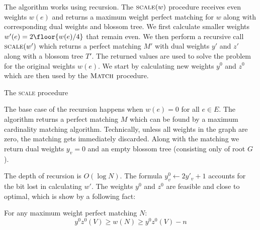 The algorithm works using recursion. The $\textsc{scale}(w)$ procedure receives even weights $w(e)$ and returns a maximum weight perfect matching for $w$ along with corresponding dual weights and blossom tree. We first calculate smaller weights $w'(e) = 2\floor{ w(e)/4 }$ that remain even. We then perform a recursive call $\textsc{scale}(w')$ which returns a perfect matching $M'$ with dual weights $y'$ and $z'$ along with a blossom tree $T'$. The returned values are used to solve the problem for the original weights $w(e)$. We start by calculating new weights $y^0$ and $z^0$ which are then used by the $\textsc{Match}$ procedure.

\begin{algorithm}
\caption{The \textsc{scale} procedure}\label{alg:scale}
\begin{algorithmic}[1]
\EndIf
{}
\EndProcedure
\end{algorithmic}
\end{algorithm}

The base case of the recursion happens when $w(e) = 0$ for all $e \in E$. The algorithm returns a perfect matching $M$ which can be found by a maximum cardinality matching algorithm. Technically, unless all weights in the graph are zero, the matching gets immediately discarded. Along with the matching we return dual weights $y_v = 0$ and an empty blossom tree (consisting only of root $G$).

The depth of recursion is $O(\log N)$. The formula $y^0_v \gets 2y'_v + 1$ accounts for the bit lost in calculating $w'$. The weights $y^0$ and $z^0$ are feasible and close to optimal, which is show by a following fact:

\begin{theorem}
    For any maximum weight perfect matching $N$:
    \begin{equation}\label{eq:3}
        y^0z^0(V) \geq w(N) \geq y^0z^0(V) - n
    \end{equation}    
\end{theorem}

